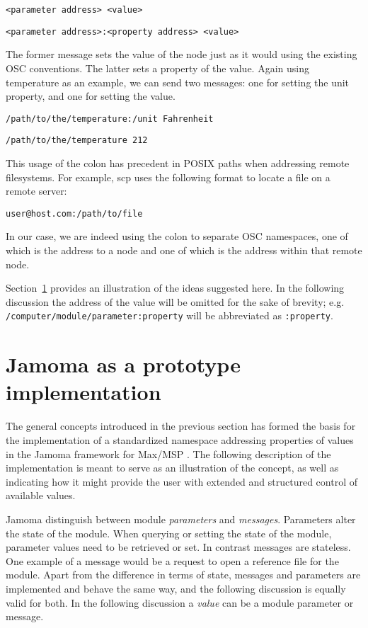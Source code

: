 \documentclass{sig-alternate}
\begin{document}
\texttt{<parameter address> <value>}

\texttt{<parameter address>:<property address> <value>}

The former message sets the value of the node just as it would using the existing OSC conventions. The latter sets a property of the value.  Again using temperature as an example, we can send two messages: one for setting the unit property, and one for setting the value.

\texttt{/path/to/the/temperature:/unit Fahrenheit}

\texttt{/path/to/the/temperature 212}

This usage of the colon has precedent in POSIX paths when addressing remote filesystems.  For example, scp uses the following format to locate a file on a remote server:

\texttt{user@host.com:/path/to/file}

In our case, we are indeed using the colon to separate OSC namespaces, one of which is the address to a node and one of which is the address within that remote node.

Section~\ref{sec:prototype_implementation} provides an illustration of the ideas suggested here. In the following discussion the address of the value will be omitted for the sake of brevity; e.g. 
\texttt{/computer/module/parameter:property} 
will be abbreviated as \texttt{:property}.







\section{Jamoma as a prototype implementation} %
\label{sec:prototype_implementation}

The general concepts introduced in the previous section has formed the basis for the implementation of a standardized namespace addressing properties of values in the Jamoma framework for Max/MSP \cite{Place:2006}. The following description of the implementation is meant to serve as an illustration of the concept, as well as indicating how it might provide the user with extended and structured control of available values.

Jamoma distinguish between module \emph{parameters} and \emph{messages}. Parameters alter the state of the module. When querying or setting the state of the module, parameter values need to be retrieved or set. In contrast messages are stateless. One example of a message would be a request to open a reference file for the module. Apart from the difference in terms of state, messages and parameters are implemented and behave the same way, and the following discussion is equally valid for both. In the following discussion a \emph{value} can be a module parameter or message.
\end{document}
